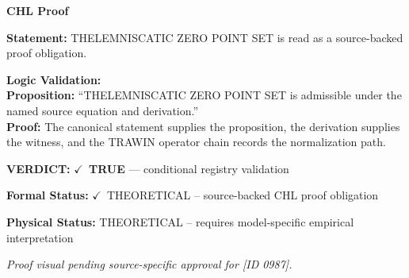 \vspace{0.45em}
\noindent\textbf{CHL Proof}\par
\textbf{Statement:} THELEMNISCATIC ZERO POINT SET is read as a source-backed proof obligation.

\textbf{Logic Validation:}\\
\textbf{Proposition:} ``THELEMNISCATIC ZERO POINT SET is admissible under the named source equation and derivation.''\\
\textbf{Proof:} The canonical statement supplies the proposition, the derivation supplies the witness, and the TRAWIN operator chain records the normalization path.

\textbf{VERDICT:} \ensuremath{\checkmark}\ \textbf{TRUE} --- conditional registry validation

\textbf{Formal Status:} \ensuremath{\checkmark}\ THEORETICAL -- source-backed CHL proof obligation

\textbf{Physical Status:} THEORETICAL -- requires model-specific empirical interpretation
\par\vspace{0.45em}
\par
\vfill
\begingroup\footnotesize\itshape
Proof visual pending source-specific approval for [ID 0987].
\par\endgroup
\vfill
\endgroup
\endgroup
